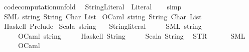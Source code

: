 \begin{isabellebody}
\isadelimproof
\isanewline
%
\endisadelimproof
\isanewline
{}\isamarkupfalse%
\ {\isacharbrackleft}{\kern0pt}code{\isacharunderscore}{\kern0pt}computation{\isacharunderscore}{\kern0pt}unfold{\isacharbrackright}{\kern0pt}{\isacharcolon}{\kern0pt}\isanewline
\ \ {\isachardoublequoteopen}String{\isachardot}{\kern0pt}Literal\ {\isacharequal}{\kern0pt}\ Literal{\isacharprime}{\kern0pt}{\isachardoublequoteclose}\isanewline
%
\isadelimproof
\ \ %
\endisadelimproof
%
\isatagproof
{}\isamarkupfalse%
\ simp%
\endisatagproof
{\isafoldproof}%
%
\isadelimproof
\isanewline
%
\endisadelimproof
\isanewline
{}\isamarkupfalse%
\isanewline
\isanewline
{}\isamarkupfalse%
\ SML\ string\ String\ Char\ List\isanewline
{}\isamarkupfalse%
\ OCaml\ string\ String\ Char\ List\isanewline
{}\isamarkupfalse%
\ Haskell\ Prelude\isanewline
{}\isamarkupfalse%
\ Scala\ string\isanewline
\isanewline
{}\isamarkupfalse%
\isanewline
\ \ \ String{\isachardot}{\kern0pt}literal\ {\isasymrightharpoonup}\isanewline
\ \ \ \ {\isacharparenleft}{\kern0pt}SML{\isacharparenright}{\kern0pt}\ {\isachardoublequoteopen}string{\isachardoublequoteclose}\isanewline
\ \ \ \ \ {\isacharparenleft}{\kern0pt}OCaml{\isacharparenright}{\kern0pt}\ {\isachardoublequoteopen}string{\isachardoublequoteclose}\isanewline
\ \ \ \ \ {\isacharparenleft}{\kern0pt}Haskell{\isacharparenright}{\kern0pt}\ {\isachardoublequoteopen}String{\isachardoublequoteclose}\isanewline
\ \ \ \ \ {\isacharparenleft}{\kern0pt}Scala{\isacharparenright}{\kern0pt}\ {\isachardoublequoteopen}String{\isachardoublequoteclose}\isanewline
{\isacharbar}{\kern0pt}\ \ {\isachardoublequoteopen}STR\ {\isacharprime}{\kern0pt}{\isacharprime}{\kern0pt}{\isacharprime}{\kern0pt}{\isacharprime}{\kern0pt}{\isachardoublequoteclose}\ {\isasymrightharpoonup}\isanewline
\ \ \ \ {\isacharparenleft}{\kern0pt}SML{\isacharparenright}{\kern0pt}\ {\isachardoublequoteopen}{\isachardoublequote}{\kern0pt}{\isachardoublequote}{\kern0pt}{\isachardoublequoteclose}\isanewline
\ \ \ \ \ {\isacharparenleft}{\kern0pt}OCaml{\isacharparenright}{\kern0pt}\ {\isachardoublequoteopen}{\isachardoublequote}{\kern0pt}{\isachardoublequote}{\kern0pt}{\isachardoublequoteclose}\isanewline

\end{isabellebody}
